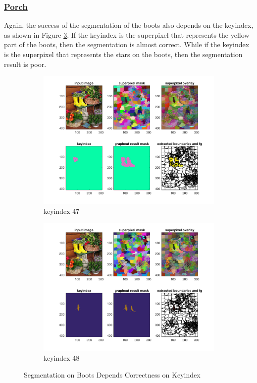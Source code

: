 \subsubsection{\href{./hw5/porch1.png}{Porch}}
Again, the success of the segmentation of the boots also depends on the keyindex, as shown in Figure \ref{fig:23}.
If the keyindex is the superpixel that represents the yellow part of the boots, then the segmentation is almost correct.
While if the keyindex is the superpixel that represents the stars on the boots, then the segmentation result is poor.
\begin{figure}[htbp]
	\centering
    \begin{subfigure}[t]{0.84\textwidth}
        \centering
        \includegraphics[width=\textwidth]{hw5/boots2.png}
		\caption{keyindex 47}\label{fig:23a}
    \end{subfigure}
    \begin{subfigure}[t]{0.84\textwidth}
        \centering
        \includegraphics[width=\textwidth]{hw5/boots1.png}
		\caption{keyindex 48}\label{fig:23b}
    \end{subfigure}
    \caption{Segmentation on Boots Depends Correctness on Keyindex}
    \label{fig:23}
\end{figure}



